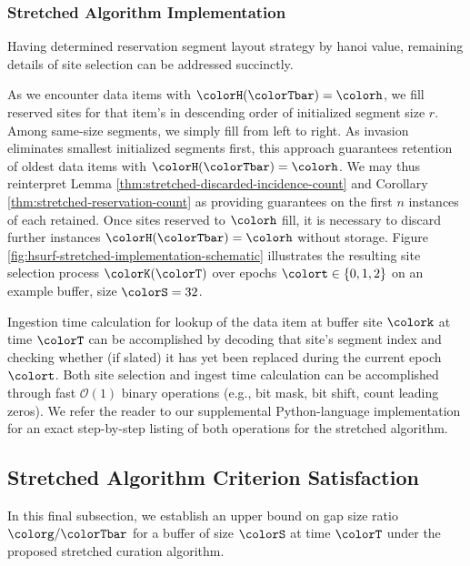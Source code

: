 


\subsubsection{Stretched Algorithm Implementation}
\label{sec:stretched-implementation}

Having determined reservation segment layout strategy by hanoi value, remaining details of site selection can be addressed succinctly.

As we encounter data items with $\colorH(\colorTbar) = \colorh$, we fill reserved sites for that item's \hv{} in descending order of initialized segment size $r$.
Among same-size segments, we simply fill from left to right.
As invasion eliminates smallest initialized segments first, this approach guarantees retention of oldest data items with $\colorH(\colorTbar) = \colorh$.
We may thus reinterpret Lemma \ref{thm:stretched-discarded-incidence-count} and Corollary \ref{thm:stretched-reservation-count} as providing guarantees on the first $n$ instances of each \hv{} retained.
Once sites reserved to \hv{} $\colorh$ fill, it is necessary to discard further instances $\colorH(\colorTbar) = \colorh$ without storage.
Figure \ref{fig:hsurf-stretched-implementation-schematic} illustrates the resulting site selection process $\colorK(\colorT)$ over epochs $\colort \in \{0,1,2\}$ on an example buffer, size $\colorS=32$.

Ingestion time calculation for lookup of the data item at buffer site $\colork$ at time $\colorT$ can be accomplished by decoding that site's segment index and checking whether (if slated) it has yet been replaced during the current epoch $\colort$.
Both site selection and ingest time calculation can be accomplished through fast $\mathcal{O}(1)$ binary operations (e.g., bit mask, bit shift, count leading zeros).
We refer the reader to our supplemental Python-language implementation for an exact step-by-step listing of both operations for the stretched algorithm.

\subsection{Stretched Algorithm Criterion Satisfaction}
\label{sec:stretched-satisfaction}

In this final subsection, we establish an upper bound on gap size ratio $\colorg / \colorTbar$ for a buffer of size $\colorS$ at time $\colorT$ under the proposed stretched curation algorithm.

